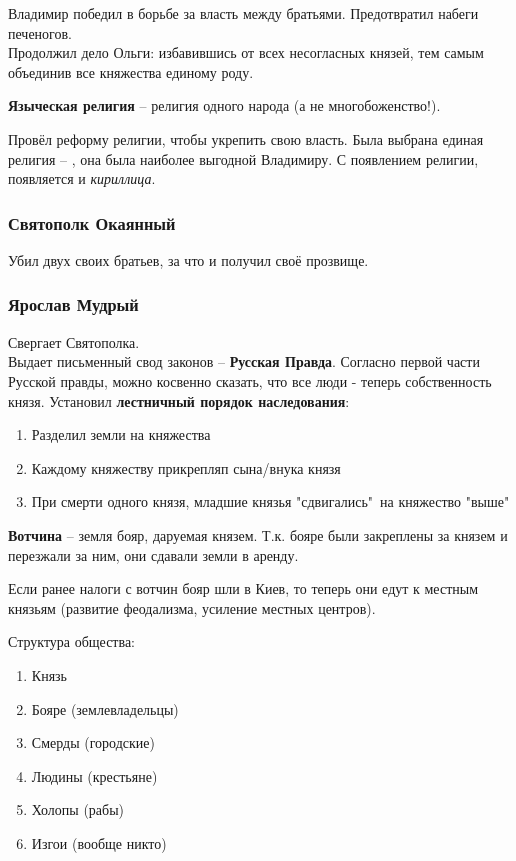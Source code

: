 Владимир победил в борьбе за власть между братьями. Предотвратил набеги печеногов. \\
Продолжил дело Ольги: избавившись от всех несогласных князей, тем самым объединив все княжества единому роду. 

\textbf{Языческая религия} -- религия одного народа (а не многобоженство!).

Провёл реформу религии, чтобы укрепить свою власть. Была выбрана единая религия -- , она была наиболее выгодной Владимиру.
С появлением религии, появляется и \textit{кириллица}. 

\subsubsection*{Святополк Окаянный}

Убил двух своих братьев, за что и получил своё прозвище.

\subsubsection*{Ярослав Мудрый}

Свергает Святополка. \\
Выдает письменный свод законов -- \textbf{Русская Правда}.
Согласно первой части Русской правды, можно косвенно сказать, что все люди - теперь собственность князя. Установил \textbf{лестничный порядок наследования}:
\begin{enumerate}
  \item Разделил земли на княжества
  \item Каждому княжеству прикрепляп сына/внука князя
  \item При смерти одного князя, младшие князья "сдвигались"\ на княжество "выше"
\end{enumerate}

\textbf{Вотчина} -- земля бояр, даруемая князем. Т.к. бояре были закреплены за князем и перезжали за ним, они сдавали земли в аренду. 

Если ранее налоги с вотчин бояр шли в Киев, то теперь они едут к местным князьям (развитие феодализма, усиление местных центров).

Структура общества:
\begin{enumerate}
  \item Князь
  \item Бояре (землевладельцы)
  \item Смерды (городские)
  \item Людины (крестьяне)
  \item Холопы (рабы)
  \item Изгои (вообще никто)
\end{enumerate}


